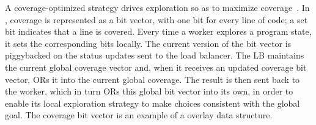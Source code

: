 A coverage-optimized strategy drives exploration so as to maximize coverage~\cite{klee}.  In \cnine, coverage is represented as a bit vector, with one bit for every line of code; a set bit indicates that a line is covered.  Every time a worker explores a program state, it sets the corresponding bits locally. The current version of the bit vector is piggybacked on the status updates sent to the load balancer.  The LB maintains the current global coverage vector and, when it receives an updated coverage bit vector, {\small OR}s it into the current global coverage.  The result is then sent back to the worker, which in turn {\small OR}s this global bit vector into its own, in order to enable its local exploration strategy to make choices consistent with the global goal.  The coverage bit vector is an example of a \cnine overlay data structure.

